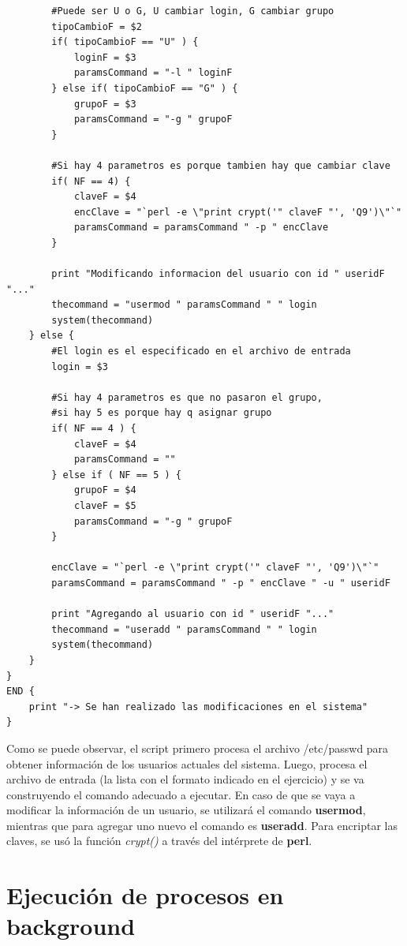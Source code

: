 \documentclass[a4paper,11pt] {article}
\begin{document}
\begin{enumerate}
\begin{verbatim}
        #Puede ser U o G, U cambiar login, G cambiar grupo
        tipoCambioF = $2
        if( tipoCambioF == "U" ) {
            loginF = $3
            paramsCommand = "-l " loginF
        } else if( tipoCambioF == "G" ) {
            grupoF = $3
            paramsCommand = "-g " grupoF
        }

        #Si hay 4 parametros es porque tambien hay que cambiar clave
        if( NF == 4) { 
            claveF = $4
            encClave = "`perl -e \"print crypt('" claveF "', 'Q9')\"`"
            paramsCommand = paramsCommand " -p " encClave
        }

        print "Modificando informacion del usuario con id " useridF "..."
        thecommand = "usermod " paramsCommand " " login
        system(thecommand)
    } else {
        #El login es el especificado en el archivo de entrada
        login = $3

        #Si hay 4 parametros es que no pasaron el grupo,
        #si hay 5 es porque hay q asignar grupo
        if( NF == 4 ) { 
            claveF = $4
            paramsCommand = ""
        } else if ( NF == 5 ) {
            grupoF = $4
            claveF = $5
            paramsCommand = "-g " grupoF
        }

        encClave = "`perl -e \"print crypt('" claveF "', 'Q9')\"`"
        paramsCommand = paramsCommand " -p " encClave " -u " useridF

        print "Agregando al usuario con id " useridF "..."
        thecommand = "useradd " paramsCommand " " login
        system(thecommand)
    }
}
END {
    print "-> Se han realizado las modificaciones en el sistema"
}
	\end{verbatim}

	Como se puede observar, el script primero procesa el archivo /etc/passwd para obtener información de los usuarios actuales del sistema. Luego, procesa el archivo de entrada (la lista con el formato indicado en el ejercicio) y se va construyendo el comando adecuado a ejecutar. En caso de que se vaya a modificar la información de un usuario, se utilizará el comando \textbf{usermod}, mientras que para agregar uno nuevo el comando es \textbf{useradd}. Para encriptar las claves, se usó la función \textit{crypt()} a través del intérprete de \textbf{perl}.

\end{enumerate}

\section*{Ejecuci\'on de procesos en background}
\end{document}
